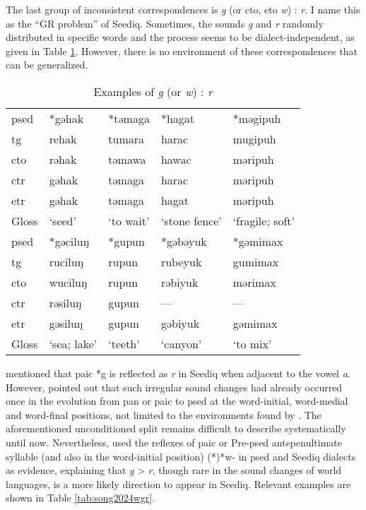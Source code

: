 The last group of inconsistent correspondences is \textit{g} (or \ac{cto}, \ac{eto} \textit{w}) : \textit{r}. I name this as the ``GR problem'' of Seediq. Sometimes, the sounds \textit{g} and \textit{r} randomly distributed in specific words and the process seems to be dialect-independent, as given in Table \ref{tab:irr_gr}. However, there is no environment of these correspondences that can be generalized. 

\begin{table}[!htbp]
\centering
\caption{Examples of \textit{g} (or \textit{w}) : \textit{r}}
\label{tab:irr_gr}
\begin{tabular}{lllll}
\hline
\acs{psed}& *gəhak   & *təmaga & *hagat   & *məgipuh \\ \hdashline
\acs{tg}  & rehak    & tumara  & harac    & mugipuh  \\
\acs{cto} & rəhak    & təmawa  & hawac    & məripuh  \\
\acs{ctr} & gəhak    & təmaga  & harac    & məripuh  \\
\acs{etr} & gəhak    & təmaga  & hagat    & məripuh  \\ \hline
Gloss     & `seed'            & `to wait'        & `stone fence'     & `fragile; soft'   \\ \hline \hline
\acs{psed}& *gəciluŋ & *gupun  & *gəbəyuk & *gəmimax \\ \hdashline
\acs{tg}  & ruciluŋ  & rupun   & rubeyuk  & gumimax  \\
\acs{cto} & wuciluŋ  & rupun   & rəbiyuk  & mərimax  \\
\acs{ctr} & rəsiluŋ  & gupun   & ---               & ---               \\
\acs{etr} & gəsiluŋ  & gupun   & gəbiyuk  & gəmimax  \\ \hline
Gloss     & `sea; lake'       & `teeth'          & `canyon'          & `to mix'         \\ \hline
\end{tabular}
\end{table}

\textcite{li1981paic} mentioned that \acl{paic} *g is reflected as \textit{r} in Seediq  when adjacent to the vowel \textit{a}. However, \textcite{song2024Aicg} pointed out that such irregular sound changes had already occurred once in the evolution from \acl{pan} or \acl{paic} to \acl{psed} at the word-initial, word-medial and word-final positions, not limited to the environments found by \textcite{li1981paic}. The aforementioned unconditioned split remains difficult to describe systematically until now. Nevertheless, \textcite{song2024Aicg} used the reflexes of \acl{paic} or Pre-\acl{psed} antepenultimate syllable (and also in the word-initial position) (*)*w- in \acl{psed} and Seediq dialects as evidence, explaining that \textit{g} > \textit{r}, though rare in the sound changes of world languages, is a more likely direction to appear in Seediq. Relevant examples are shown in Table \ref{tab:song2024wgr}.

